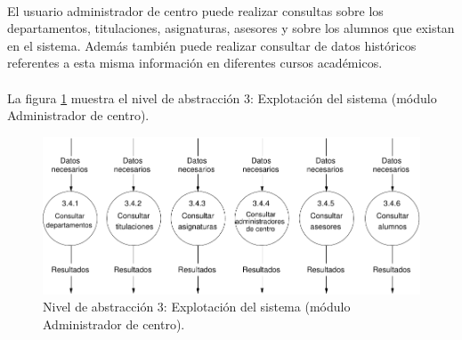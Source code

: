 \paragraph{}El usuario administrador de centro puede realizar consultas sobre
los departamentos, titulaciones, asignaturas, asesores y sobre los alumnos que
existan en el sistema. Además también puede realizar consultar de datos
históricos referentes a esta misma información en diferentes cursos académicos.

\paragraph{}La figura \ref{diagramaNivel3-ExplotacionSistema-adminCentro}
muestra el nivel de abstracción 3: Explotación del sistema (módulo Administrador
de centro).

  \begin{figure}[!ht]
    \begin{center}
      \includegraphics[]{08.Analisis_Funcional/8.2.DFDs/Niveles/Nivel3/AdministradorCentro/ExplotacionSistema/Diagramas/nivel3-ExplotacionSistema.pdf}
      \caption{Nivel de abstracción 3: Explotación del sistema (módulo
      Administrador de centro).}
      \label{diagramaNivel3-ExplotacionSistema-adminCentro}
    \end{center}
  \end{figure}
